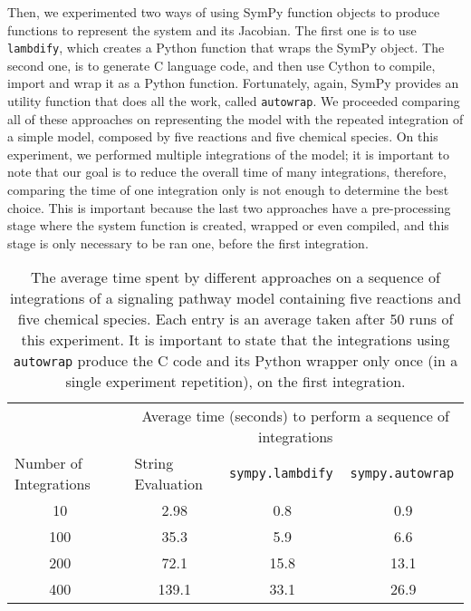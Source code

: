 Then, we experimented two ways of using SymPy function objects to 
produce functions to represent the system and its Jacobian. The first
one is to use {\tt lambdify}, which creates a Python function that wraps 
the SymPy object. The second one, is to generate C language code, and 
then use Cython to compile, import and wrap it as a Python function.
Fortunately, again, SymPy provides an utility function that does all the
work, called {\tt autowrap}. We proceeded comparing all of these 
approaches on representing the model with the repeated integration of a 
simple model, composed by five reactions and five chemical species. On
this experiment, we performed multiple integrations of the model; it is
important to note that our goal is to reduce the overall time of many
integrations, therefore, comparing the time of one integration only is
not enough to determine the best choice. This is important because the
last two approaches have a pre-processing stage where the system
function is created, wrapped or even compiled, and this stage is only
necessary to be ran one, before the first integration.

\begin{table}[]
\centering
\begin{tabular}{c c ccc}
\hline
\multicolumn{1}{l}{} 
&& \multicolumn{3}{c}{Average time (seconds) to perform a sequence of 
    integrations} \\
\multicolumn{1}{l}{Number of Integrations}               
&& \multicolumn{1}{l}{String Evaluation} 
& \multicolumn{1}{l}{{\tt sympy.lambdify}} 
& \multicolumn{1}{l}{{\tt sympy.autowrap}} \\ \hline 
    10  &&   2.98    & 0.8   & 0.9 \\
    100 && 35.3      & 5.9   & 6.6 \\ 
    200 && 72.1      & 15.8  & 13.1 \\
    400 && 139.1     & 33.1  & 26.9 \\
\hline \hline
\end{tabular}
\caption{The average time spent by different approaches on a sequence of
integrations of a signaling pathway model containing five reactions and
five chemical species. Each entry is an average taken after 50 runs of 
this experiment. It is important to state that the integrations using 
{\tt autowrap} produce the C code and its Python wrapper only once (in a
single experiment repetition), on the first integration. }
\label{tab:system_representation_experiment}
\end{table}

